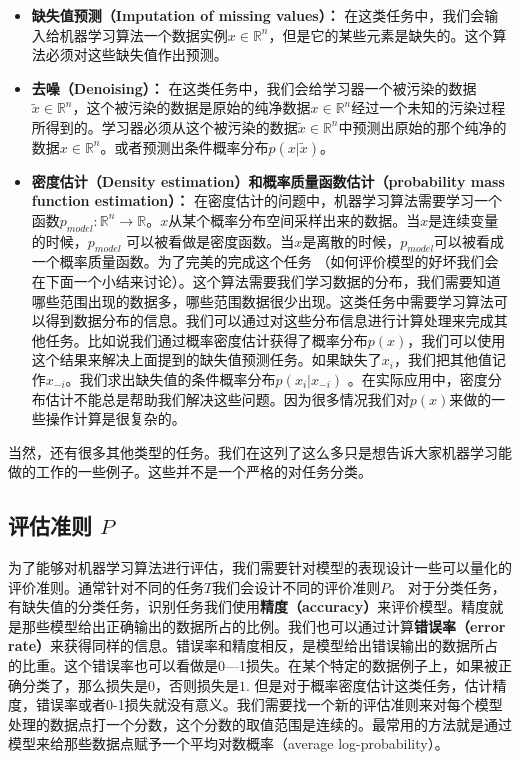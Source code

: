 \begin{itemize}
\item \textbf{缺失值预测（Imputation of missing values）：} 在这类任务中，我们会输入给机器学习算法一个数据实例$x\in \mathbb{R}^{n}$，但是它的某些元素是缺失的。这个算法必须对这些缺失值作出预测。

\item \textbf{去噪（Denoising）：} 在这类任务中，我们会给学习器一个被污染的数据$\widetilde{x}\in \mathbb{R}^{n}$，这个被污染的数据是原始的纯净数据$x\in \mathbb{R}^{n}$经过一个未知的污染过程所得到的。学习器必须从这个被污染的数据$\widetilde{x}\in \mathbb{R}^{n}$中预测出原始的那个纯净的数据$x\in \mathbb{R}^{n}$。或者预测出条件概率分布$p(x|\widetilde{x})$。

\item \textbf{密度估计（Density estimation）和概率质量函数估计（probability mass function estimation）：} 在密度估计的问题中，机器学习算法需要学习一个函数$p_{model}:\mathbb{R}^{n}\rightarrow \mathbb{R}$。$x$从某个概率分布空间采样出来的数据。当$x$是连续变量的时候，$p_{model}$ 可以被看做是密度函数。当$x$是离散的时候，$p_{model}$可以被看成一个概率质量函数。为了完美的完成这个任务 （如何评价模型的好坏我们会在下面一个小结来讨论）。这个算法需要我们学习数据的分布，我们需要知道哪些范围出现的数据多，哪些范围数据很少出现。这类任务中需要学习算法可以得到数据分布的信息。我们可以通过对这些分布信息进行计算处理来完成其他任务。比如说我们通过概率密度估计获得了概率分布$p(x)$，我们可以使用这个结果来解决上面提到的缺失值预测任务。如果缺失了$x_i$，我们把其他值记作$x_{-i}$。我们求出缺失值的条件概率分布$p(x_i|x_{-i})$ 。在实际应用中，密度分布估计不能总是帮助我们解决这些问题。因为很多情况我们对$p(x)$来做的一些操作计算是很复杂的。
\end{itemize}

当然，还有很多其他类型的任务。我们在这列了这么多只是想告诉大家机器学习能做的工作的一些例子。这些并不是一个严格的对任务分类。


\subsection{评估准则 $P$}
为了能够对机器学习算法进行评估，我们需要针对模型的表现设计一些可以量化的评价准则。通常针对不同的任务$T$我们会设计不同的评价准则$P$。
对于分类任务，有缺失值的分类任务，识别任务我们使用\textbf{精度（accuracy）}来评价模型。精度就是那些模型给出正确输出的数据所占的比例。我们也可以通过计算\textbf{错误率（error rate）}来获得同样的信息。错误率和精度相反，是模型给出错误输出的数据所占的比重。这个错误率也可以看做是0—1损失。在某个特定的数据例子上，如果被正确分类了，那么损失是$0$，否则损失是$1$. 但是对于概率密度估计这类任务，估计精度，错误率或者0-1损失就没有意义。我们需要找一个新的评估准则来对每个模型处理的数据点打一个分数，这个分数的取值范围是连续的。最常用的方法就是通过模型来给那些数据点赋予一个平均对数概率（average log-probability）。

